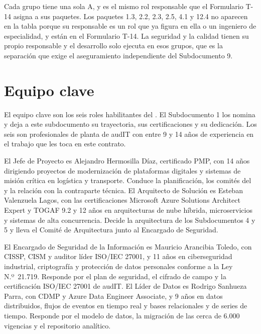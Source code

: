 Cada grupo tiene una sola A, y es el mismo rol responsable que el Formulario T-14 asigna a sus paquetes.
Los paquetes 1.3, 2.2, 2.3, 2.5, 4.1 y 12.4 no aparecen en la tabla porque su responsable es un rol que
ya figura en ella o un ingeniero de especialidad, y están en el Formulario T-14. La seguridad y la calidad
tienen su propio responsable y el desarrollo solo ejecuta en esos grupos, que es la separación que exige
el aseguramiento independiente del Subdocumento 9.

\section{Equipo clave}\label{sec:12-equipo-clave}

El equipo clave son los seis roles habilitantes del . El Subdocumento 1 los nomina y deja a
este subdocumento su trayectoria, sus certificaciones y su dedicación. Los seis son profesionales de
planta de audIT con entre 9 y 14 años de experiencia en el trabajo que les toca en este contrato.

El Jefe de Proyecto es Alejandro Hermosilla Díaz, certificado PMP, con 14 años dirigiendo proyectos de
modernización de plataformas digitales y sistemas de misión crítica en logística y transporte. Conduce
la planificación, los comités del  y la relación con la contraparte técnica. El Arquitecto
de Solución es Esteban Valenzuela Lagos, con las certificaciones Microsoft Azure Solutions Architect
Expert y TOGAF 9.2 y 12 años en arquitecturas de nube híbrida, microservicios y sistemas de alta
concurrencia. Decide la arquitectura de los Subdocumentos 4 y 5 y lleva el Comité de Arquitectura junto
al Encargado de Seguridad.

El Encargado de Seguridad de la Información es Mauricio Arancibia Toledo, con CISSP, CISM y auditor
líder ISO/IEC 27001, y 11 años en ciberseguridad industrial, criptografía y protección de datos
personales conforme a la Ley N.º~21.719. Responde por el plan de seguridad, el cifrado de campo y la
certificación ISO/IEC 27001 de audIT. El Líder de Datos es Rodrigo Sanhueza Parra, con CDMP y Azure
Data Engineer Associate, y 9 años en datos distribuidos, flujos de eventos en tiempo real y bases
relacionales y de series de tiempo. Responde por el modelo de datos, la migración de las cerca de 6.000
vigencias y el repositorio analítico.

